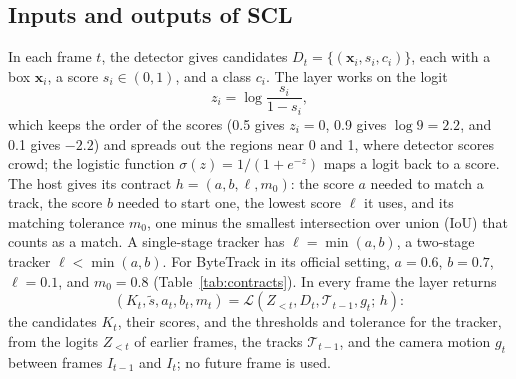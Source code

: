 \documentclass[pdflatex,sn-mathphys-num,iicol]{sn-jnl}
\begin{document}
\subsection{Inputs and outputs of SCL}\label{sec:problem}
In each frame $t$, the detector gives candidates $D_t=\{(\mathbf{x}_i,s_i,c_i)\}$, each with a box
$\mathbf{x}_i$, a score $s_i\in(0,1)$, and a class $c_i$. The layer works on the logit
\begin{equation}
z_i=\log\frac{s_i}{1-s_i},
\label{eq:logit}
\end{equation}
which keeps the order of the scores (0.5 gives $z_i=0$, 0.9 gives $\log9=2.2$, and 0.1 gives $-2.2$)
and spreads out the regions near 0 and 1, where detector scores crowd; the logistic function
$\sigma(z)=1/(1+e^{-z})$ maps a logit back to a score. The host gives its contract $h=(a,b,\ell,m_0)$:
the score $a$ needed to match a track, the score $b$ needed to start one, the lowest score $\ell$ it
uses, and its matching tolerance $m_0$, one minus the smallest intersection over union (IoU) that
counts as a match. A single-stage tracker has $\ell=\min(a,b)$, a two-stage tracker $\ell<\min(a,b)$.
For ByteTrack in its official setting, $a=0.6$, $b=0.7$, $\ell=0.1$, and $m_0=0.8$
(Table~\ref{tab:contracts}). In every frame the layer returns
\begin{equation}
\left(K_t,\tilde{s},a_t,b_t,m_t\right)=
\mathcal{L}\left(Z_{<t},D_t,\mathcal{T}_{t-1},g_t;\,h\right):
\label{eq:layer}
\end{equation}
the candidates $K_t$, their scores, and the thresholds and tolerance for the tracker, from the logits
$Z_{<t}$ of earlier frames, the tracks $\mathcal{T}_{t-1}$, and the camera motion $g_t$ between frames
$I_{t-1}$ and $I_t$; no future frame is used.
\end{document}

